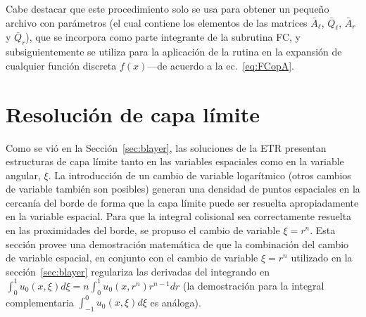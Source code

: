 Cabe destacar que este procedimiento  solo se usa para obtener un pequeño archivo con parámetros 
(el cual contiene los elementos de las matrices $\bar{A}_{\ell}$, $\bar{Q}_{\ell}$, $\bar{A}_{r}$ y $\bar{Q}_r$), que se incorpora como parte integrante de la subrutina FC, y subsiguientemente se utiliza para la aplicación de la rutina en la expansión de cualquier función discreta $f(x)$---de acuerdo a la ec.~\eqref{eq:FCopA}.  

\chapter{Resolución de capa límite}
\label{ap:demcv}
Como se vió en la Sección~\ref{sec:blayer}, las soluciones de la ETR presentan 
estructuras de capa límite tanto en las variables espaciales como en la variable angular, $\xi$. 
La introducción de un cambio de variable logarítmico (otros cambios 
de variable también son posibles) generan una densidad de puntos espaciales en la cercanía 
del borde de forma que la capa límite puede ser resuelta apropiadamente en 
la variable espacial. Para que la integral colisional sea correctamente 
resuelta en las proximidades del borde, se propuso el cambio de variable $\xi=r^n$. 
Esta sección provee una demostración matemática de que la combinación del cambio 
de variable espacial, en conjunto con el cambio de variable $\xi=r^n$ utilizado 
en la sección~\ref{sec:blayer} regulariza las derivadas 
del integrando en $\int_0^1 u_0(x,\xi)d\xi = n\int_0^1  u_0(x,r^n) r^{n-1} dr$ (la demostración 
para la integral complementaria  $\int_{-1}^0 u_0(x,\xi)d\xi$ es análoga). 

